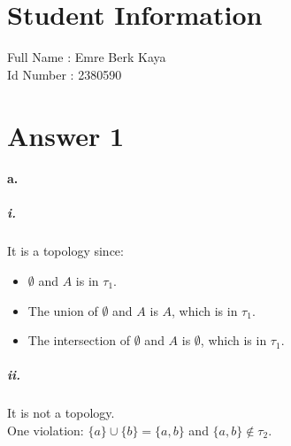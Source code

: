 \documentclass[11pt]{article}
\begin{document}
\section*{Student Information } 
Full Name : Emre Berk Kaya \\
Id Number :  2380590\\
\doublespacing
\section*{Answer 1}
\paragraph{a.}
    \subparagraph{i.}
    It is a topology since:
    \begin{itemize}
        \item $\emptyset$ and $A$ is in $\tau_1$.
        \item The union of $\emptyset$ and $A$ is $A$, which is in $\tau_1$.
        \item The intersection of $\emptyset$ and $A$ is $\emptyset$, which is in $\tau_1$. 
    \end{itemize}
    
    \subparagraph{ii.}
    It is not a topology.\\
    \-\hspace{32px} One violation: $\{a\} \cup \{b\} = \{a,b\}$ and $\{a,b\} \notin \tau_2$.
    
\end{document}
